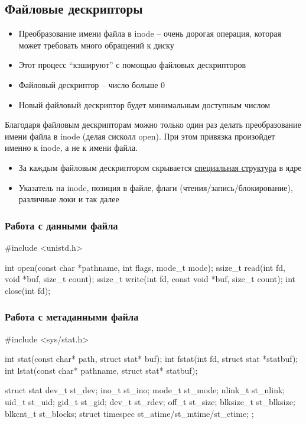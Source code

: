   \subsection{Файловые дескрипторы}
    \begin{itemize}
      \item Преобразование имени файла в inode -- очень дорогая операция, которая может требовать много обращений к диску
      \item Этот процесс ``кэшируют'' с помощью файловых дескрипторов
      \item Файловый дескриптор -- число больше 0
      \item Новый файловый дескриптор будет минимальным доступным числом
    \end{itemize}
  Благодаря файловым дескрипторам можно только один раз делать преобразование имени файла в inode (делая сисколл open). При этом привязка произойдет именно к inode, а не к имени файла.
    \begin{itemize}
      \item За каждым файловым дескриптором скрывается \href{https://elixir.bootlin.com/linux/v5.19.12/source/include/linux/fs.h#L925}{специальная структура} в ядре
      \item Указатель на inode, позиция в файле, флаги (чтения/запись/блокирование), различные локи и так далее
    \end{itemize}
  
    \subsubsection{Работа с данными файла}
\begin{cminted}
#include <unistd.h>

int open(const char *pathname, int flags, mode_t mode);
ssize_t read(int fd, void *buf, size_t count);
ssize_t write(int fd, const void *buf, size_t count);
int close(int fd);
\end{cminted}
    
    \subsubsection{Работа с метаданными файла}
\begin{cminted}
#include <sys/stat.h>

int stat(const char* path, struct stat* buf);
int fstat(int fd, struct stat *statbuf);
int lstat(const char* pathname, struct stat* statbuf);

struct stat {
  dev_t     st_dev;
  ino_t     st_ino;
  mode_t    st_mode;
  nlink_t   st_nlink;
  uid_t     st_uid;
  gid_t     st_gid;
  dev_t     st_rdev;
  off_t     st_size;
  blksize_t st_blksize;
  blkcnt_t  st_blocks;
  struct timespec st_atime/st_mtime/st_ctime;
};
\end{cminted}
    
